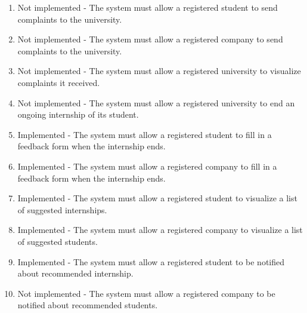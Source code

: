 \begin{enumerate}[label=\textbf{R\arabic* -}]
    \item Not implemented - The system must allow a registered student to send complaints to the university.
    \item Not implemented - The system must allow a registered company to send complaints to the university.
    \item Not implemented - The system must allow a registered university to visualize complaints it received.
    \item Not implemented - The system must allow a registered university to end an ongoing internship of its student.
    \item Implemented - The system must allow a registered student to fill in a feedback form when the internship ends.
    \item Implemented - The system must allow a registered company to fill in a feedback form when the internship ends.
    \item Implemented - The system must allow a registered student to visualize a list of suggested internships.
    \item Implemented - The system must allow a registered company to visualize a list of suggested students.
    \item Implemented - The system must allow a registered student to be notified about recommended internship.
    \item Not implemented - The system must allow a registered company to be notified about recommended students.
\end{enumerate}


